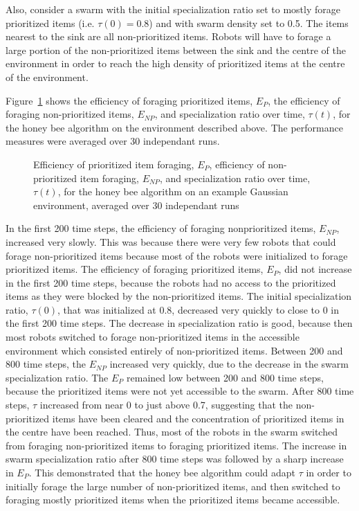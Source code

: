 Also, consider a swarm with the initial specialization ratio set to mostly forage prioritized items (i.e. $\tau(0)=0.8$) and with swarm density set to 0.5. The items nearest to the sink are all non-prioritized items. Robots will have to forage a large portion of the non-prioritized items between the sink and the centre of the environment in order to reach the high density of prioritized items at the centre of the environment. 


Figure~\ref{fig:gaussianhighdensityperformancehoneybee} shows the efficiency of foraging prioritized items, $E_P$, the efficiency of foraging non-prioritized items, $E_{NP}$, and specialization ratio over time, $\tau(t)$, for the honey bee algorithm on the environment described above. The performance measures were averaged over 30 independant runs.


\begin{figure}[!htbp]
\centering
\small
\resizebox{\textwidth}{!}{}
\caption{Efficiency of prioritized item foraging, $E_P$, efficiency of non-prioritized item foraging, $E_{NP}$, and specialization ratio over time, $\tau(t)$, for the honey bee algorithm on an example Gaussian environment, averaged over 30 independant runs}
\label{fig:gaussianhighdensityperformancehoneybee}
\end{figure}

In the first 200 time steps, the efficiency of foraging nonprioritized items, $E_{NP}$, increased very slowly. This was because there were very few robots that could forage non-prioritized items because most of the robots were initialized to forage prioritized items. The efficiency of foraging prioritized items, $E_{P}$, did not increase in the first 200 time steps, because the robots had no access to the prioritized items as they were blocked by the non-prioritized items. The initial specialization ratio, $\tau(0)$, that was initialized at 0.8, decreased very quickly to close to 0 in the first 200 time steps. The decrease in specialization ratio is good, because then most robots switched to forage non-prioritized items in the accessible environment which consisted entirely of non-prioritized items. Between 200 and 800 time steps, the $E_{NP}$ increased very quickly, due to the decrease in the swarm specialization ratio. The $E_{P}$ remained low between 200 and 800 time steps, because the prioritized items were not yet accessible to the swarm. After 800 time steps, $\tau$ increased from near 0 to just above 0.7, suggesting that the non-prioritized items have been cleared and the concentration of prioritized items in the centre have been reached. Thus, most of the robots in the swarm switched from foraging non-prioritized items to foraging prioritized items. The increase in swarm specialization ratio after 800 time steps was followed by a sharp increase in $E_P$. This demonstrated that the honey bee algorithm could adapt $\tau$ in order to initially forage the large number of non-prioritized items, and then switched to foraging mostly prioritized items when the prioritized items became accessible.

